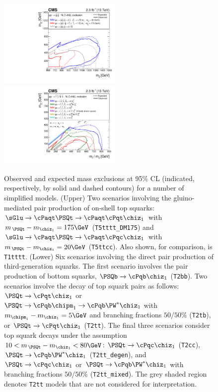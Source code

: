\begin{figure}[h!]
  \begin{center}
    \includegraphics[width=0.53\textwidth]{figures/limits/v3/naturalWT1SUMMARY.pdf}
    \includegraphics[width=0.53\textwidth]{figures/limits/v3/allThirdGenSUMMARY.pdf} 
    \caption{ Observed and expected mass exclusions at 95\% CL
      (indicated, respectively, by solid and dashed contours) for a
      number of simplified models. (Upper) Two scenarios involving the
      gluino-mediated pair production of on-shell top squarks:
      $\sGlu\ra\cPaqt\PSQt\ra\cPaqt\cPqt\chiz_1$ with $m_{\,\PSQt} -
      m_{\chiz_1} = 175\GeV$ (\texttt{T5tttt\_DM175}) and
      $\sGlu\ra\cPaqt\PSQt\ra\cPaqt\cPqc\chiz_1$ with $m_{\,\PSQt} -
      m_{\chiz_1} = 20\GeV$ (\texttt{T5ttcc}). Also shown, for
      comparison, is \texttt{T1tttt}. (Lower) Six scenarios involving
      the direct pair production of third-generation squarks. The
      first scenario involves the pair production of bottom squarks,
      $\PSQb\ra\cPqb\chiz_1$ (\texttt{T2bb}). Two scenarios involve
      the decay of top squark pairs as follows: $\PSQt\ra\cPqt\chiz_1$
      or $\PSQt\ra\cPqb\chipm_1\ra\cPqb\PW^*\chiz_1$ with
      $m_{\chipm_1} - m_{\chiz_1} = 5\GeV$ and branching fractions
      $50/50\%$ (\texttt{T2tb}), or $\PSQt\ra\cPqt\chiz_1$
      (\texttt{T2tt}). The final three scenarios consider top squark
      decays under the assumption $10 < m_{\,\PSQt} - m_{\chiz_1} <
      80\GeV$: $\PSQt\ra\cPqc\chiz_1$ (\texttt{T2cc}),
      $\PSQt\ra\cPqb\PW^*\chiz_1$ (\texttt{T2tt\_degen}), and
      $\PSQt\ra\cPqc\chiz_1$ or $\PSQt\ra\cPqb\PW^*\chiz_1$ with
      branching fractions $50/50\%$ (\texttt{T2tt\_mixed}). The grey
      shaded region denotes \texttt{T2tt} models that are not
      considered for interpretation. }
    \label{fig:limits-sms-2} 
  \end{center} 
\end{figure}

